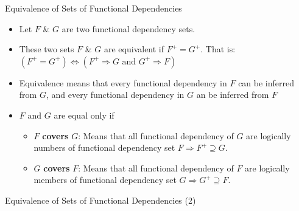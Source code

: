 \documentclass[aspectratio=169, xcolor=dvipsnames]{beamer}
\begin{document}
\begin{frame}{Equivalence of Sets of Functional Dependencies}
    \begin{itemize}[<+->]
        \item Let $F$ \& $G$ are two functional dependency sets.
        \item These two sets $F$ \& $G$ are equivalent if $F^+ = G^+$. That is: $(F^+ = G^+) \Leftrightarrow (F^+ \Rightarrow G \text{ and } G^+ \Rightarrow F)$
        \item Equivalence means that every functional dependency in $F$ can be inferred from $G$, and every functional dependency in $G$ an be inferred from $F$
        \item $F$ and $G$ are equal only if
        \begin{itemize}
            \item[$\triangleright$] $F$ \textbf{covers} $G$: Means that all functional dependency of $G$ are logically numbers of functional dependency set $F \Rightarrow F^+ \supseteq G$.
            \item[$\triangleright$] $G$ \textbf{covers} $F$: Means that all functional dependency of $F$ are logically members of functional dependency set $G \Rightarrow G^+ \supseteq F$.
        \end{itemize}
    \end{itemize}
\end{frame}

\begin{frame}{Equivalence of Sets of Functional Dependencies (2)}
    \begin{table}[H]
        \centering
    \end{table}
\end{frame}
\end{document}
